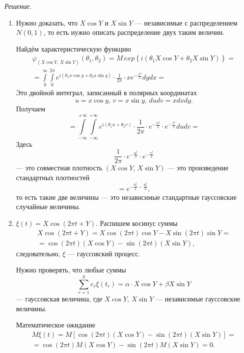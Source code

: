 \textit{Решение.}
\begin{enumerate}[label=\alph*)]
  \item Нужно доказать, что $X \cos Y$ и $X \sin Y$ ---
  независимые с распределением $N \left( 0, 1 \right) $,
  то есть нужно описать распределение двух таким величин.

  Найдём характеристическую функцию
  \begin{gather*}
    \varphi_{ \left( X \cos Y, \, X \sin Y \right) } \left( \theta_1, \theta_2 \right) =
    M \, exp \left\{ i \left( \theta_1 X \cos Y + \theta_2 X \sin Y \right) \right\} = \\
    = \int \limits_0^{ \infty }
      \int \limits_{0}^{2 \pi }
        e^{i \left( \theta_1 x \cos y + \theta_2 x \sin y \right) } \cdot \frac{1}{2 \pi } \cdot
        xe^{-\frac{x^2}{2}} dydx =
  \end{gather*}
  Это двойной интеграл, записанный в полярных координатах
  $$u = x \cos y, \,
    v = x \sin y, \,
    dudv = xdxdy.$$
  Получаем
  $$= \int \limits_{-\infty }^{+\infty }
    \int \limits_{-\infty }^{+\infty }
      e^{i \left( \theta_1 u + \theta_2 v \right) } \cdot \frac{1}{2 \pi } \cdot
      e^{-\frac{u^2}{2}} \cdot e^{-\frac{v^2}{2}} dudv =$$
  Здесь
  $$ \frac{1}{2 \pi } \cdot e^{-\frac{u^2}{2}} \cdot e^{-\frac{v^2}{2}}$$ ---
  это совместная плотность $ \left( X \cos Y, \, X \sin Y \right) $ ---
  это произведение стандартных плотностей
  $$= e^{-\frac{ \theta_1^2}{2} - \frac{ \theta_2^2}{2}},$$
  то есть такие две величины --- это независимые стандартные гауссовские случайные величины.
  \item $ \xi \left( t \right) = X \cos \left( 2 \pi t + Y \right) $.
  Распишем косинус суммы
  \begin{gather*}
    X \cos \left( 2 \pi t + Y \right) =
    X \cos \left( 2 \pi t \right) \cos Y - X \sin \left( 2 \pi t \right) \sin Y = \\
    = \cos \left( 2 \pi t \right) \left( X \cos Y \right) -
    \sin \left( 2 \pi t \right) \left( X \sin Y \right),
  \end{gather*}
  следовательно, $ \xi $ --- гауссовский процесс.

  Нужно проверять, что любые суммы
  $$ \sum \limits_{r = 1}^k c_r \xi \left( t_r \right) =
    \alpha \cdot X \cos Y + \beta X \sin Y$$
  --- гауссовская величина, где $X \cos Y, \, X \sin Y$ --- независимые гауссовские величины.

  Математическое ожидание
  \begin{gather*}
    M \xi \left( t \right) =
    M \left[
      \cos \left( 2 \pi t \right) \left( X \cos Y \right) -
      \sin \left( 2 \pi t \right) \left( X \sin Y \right) \right] = \\
    = \cos \left( 2 \pi t \right) M \left( X \cos Y \right) -
    \sin \left( 2 \pi t \right) M \left( X \sin Y \right) =
    0.
  \end{gather*}


\end{enumerate}
